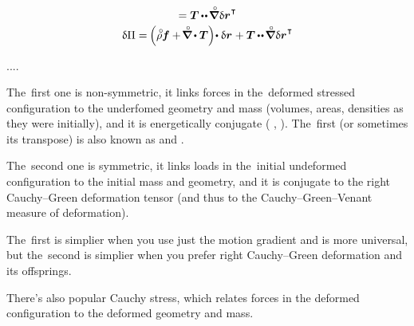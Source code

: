 \begin{equation*}
\begin{array}{c}
= \firstpiolakirchhoffstress \hspace{-0.1ex} \dotdotp \hspace{-0.2ex} \boldnablacircled \hspace{.1ex} \variation{\currentlocationvector}^{\hspace{.1ex}\T}
\\[.25em]
%
\variation{\potentialenergydensity}
= \hspace{-0.15ex} \left(^{\mathstrut} \hspace{-0.1ex} \mathcircabove{\rho} \bm{f} + \hspace{-0.25ex} \boldnablacircled \hspace{-0.1ex} \dotp \firstpiolakirchhoffstress \right) \hspace{-0.4ex} \dotp \variation{\currentlocationvector}
\hspace{.1ex}
+ \firstpiolakirchhoffstress \hspace{-0.1ex} \dotdotp \hspace{-0.2ex} \boldnablacircled \hspace{.1ex} \variation{\currentlocationvector}^{\hspace{.1ex}\T}
\end{array}
\end{equation*}

....

The~first one is non-symmetric, it links forces in the~deformed stressed configuration to the underfomed geometry and mass (volumes, areas, densities as they were initially), and it is energetically conjugate  ( ,  ).
The~first (or sometimes its transpose) is also known as  and .

The~second one is symmetric, it links loads in the~initial undeformed configuration to the initial mass and geometry, and it is conjugate to the right Cauchy\hbox{--}Green deformation tensor (and thus to the Cauchy\hbox{--}Green\hbox{--}Venant measure of deformation).

The~first is simplier when you use just the motion gradient and is more universal, but the~second is simplier when you prefer right Cauchy\hbox{--}Green deformation and its offsprings.

There’s also popular Cauchy stress, which relates forces in the deformed configuration to the deformed geometry and mass.


